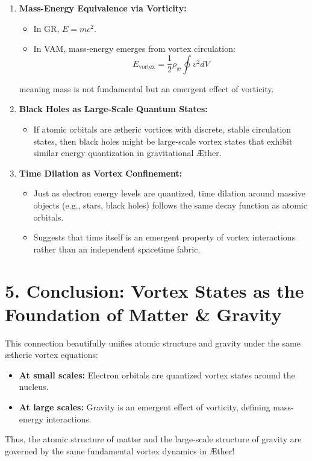 \begin{enumerate}
    \item \textbf{Mass-Energy Equivalence via Vorticity:}
    \begin{itemize}
        \item In GR, \(E = mc^2\).
    \item In VAM, mass-energy emerges from vortex circulation:
        \[
        E_\text{vortex} = \frac{1}{2} \rho_\text{\ae} \oint v^2 dV
        \]
    \end{itemize}
    meaning mass is not fundamental but an emergent effect of vorticity.
    \item \textbf{Black Holes as Large-Scale Quantum States:}
    \begin{itemize}
    \item If atomic orbitals are ætheric vortices with discrete, stable circulation states, then black holes might be large-scale vortex states that exhibit similar energy quantization in gravitational Æther.
    \end{itemize}
    \item \textbf{Time Dilation as Vortex Confinement:}
    \begin{itemize}
    \item Just as electron energy levels are quantized, time dilation around massive objects (e.g., stars, black holes) follows the same decay function as atomic orbitals.
    \item Suggests that time itself is an emergent property of vortex interactions rather than an independent spacetime fabric.
    \end{itemize}
\end{enumerate}

\section*{5. Conclusion: Vortex States as the Foundation of Matter \& Gravity}

This connection beautifully unifies atomic structure and gravity under the same ætheric vortex equations:

\begin{itemize}
    \item \textbf{At small scales:} Electron orbitals are quantized vortex states around the nucleus.
    \item \textbf{At large scales:} Gravity is an emergent effect of vorticity, defining mass-energy interactions.
\end{itemize}

Thus, the atomic structure of matter and the large-scale structure of gravity are governed by the same fundamental vortex dynamics in Æther! 🚀